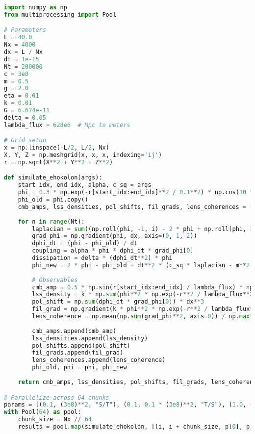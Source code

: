 \documentclass[11pt]{article}
\begin{document}
\begin{lstlisting}[language=Python, caption={Fluxonic CMB and LSS Simulation}, label=lst:simulation]
import numpy as np
from multiprocessing import Pool

# Parameters
L = 40.0
Nx = 4000
dx = L / Nx
dt = 1e-15
Nt = 200000
c = 3e8
m = 0.5
g = 2.0
eta = 0.01
k = 0.01
G = 6.674e-11
delta = 0.05
lambda_flux = 628e6  # Mpc to meters

# Grid setup
x = np.linspace(-L/2, L/2, Nx)
X, Y, Z = np.meshgrid(x, x, x, indexing='ij')
r = np.sqrt(X**2 + Y**2 + Z**2)

def simulate_ehokolon(args):
    start_idx, end_idx, alpha, c_sq = args
    phi = 0.3 * np.exp(-r[start_idx:end_idx]**2 / 0.1**2) * np.cos(10 * X[start_idx:end_idx]) + 0.1 * np.random.rand(Nx//64, Nx, Nx)
    phi_old = phi.copy()
    cmb_amps, lss_densities, pol_shifts, fil_grads, lens_coherences = [], [], [], [], []
    
    for n in range(Nt):
        laplacian = sum((np.roll(phi, -1, i) - 2 * phi + np.roll(phi, 1, i)) / dx**2 for i in range(3))
        grad_phi = np.gradient(phi, dx, axis=(0, 1, 2))
        dphi_dt = (phi - phi_old) / dt
        coupling = alpha * phi * dphi_dt * grad_phi[0]
        dissipation = delta * (dphi_dt**2) * phi
        phi_new = 2 * phi - phi_old + dt**2 * (c_sq * laplacian - m**2 * phi - g * phi**3 - eta * phi**5 + coupling - dissipation)
        
        # Observables
        cmb_amp = 0.5 * np.sin(r[start_idx:end_idx] / lambda_flux) * np.mean(np.abs(dphi_dt)) * dx**3
        lss_density = k * np.sum(phi**2 * np.exp(-r**2 / lambda_flux**2)) * dx**3
        pol_shift = np.sum(dphi_dt * grad_phi[0]) * dx**3
        fil_grad = np.gradient(k * phi**2 * np.exp(-r**2 / lambda_flux**2), dx, axis=0)
        lens_coherence = np.mean(np.sum(grad_phi**2, axis=0)) / np.max(np.sum(grad_phi**2, axis=0))
        
        cmb_amps.append(cmb_amp)
        lss_densities.append(lss_density)
        pol_shifts.append(pol_shift)
        fil_grads.append(fil_grad)
        lens_coherences.append(lens_coherence)
        phi_old, phi = phi, phi_new
    
    return cmb_amps, lss_densities, pol_shifts, fil_grads, lens_coherences

# Parallelize across 64 chunks
params = [(0.1, (3e8)**2, "S/T"), (0.1, 0.1 * (3e8)**2, "T/S"), (1.0, (3e8)**2, "S=T")]
with Pool(64) as pool:
    chunk_size = Nx // 64
    results = pool.map(simulate_ehokolon, [(i, i + chunk_size, p[0], p[1]) for i in range(0, Nx, chunk_size) for p in params])
\end{lstlisting}
\end{document}
